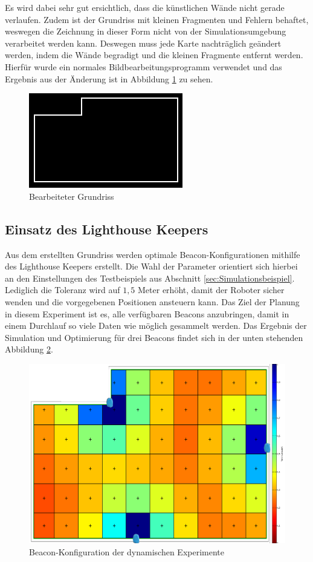 Es wird dabei sehr gut ersichtlich, dass die künstlichen Wände nicht gerade verlaufen. Zudem ist der Grundriss mit kleinen Fragmenten und Fehlern behaftet, weswegen die Zeichnung in dieser Form nicht von der Simulationsumgebung verarbeitet werden kann. Deswegen muss jede Karte nachträglich geändert werden, indem die Wände begradigt und die kleinen Fragmente entfernt werden. Hierfür wurde ein normales Bildbearbeitungsprogramm verwendet und das Ergebnis aus der Änderung ist in Abbildung \ref{fig:Masterraum2} zu sehen.  
\begin{figure}[H] 
\centering
\includegraphics[scale=0.8]{Bilder/Masterraum2}
\caption{Bearbeiteter Grundriss}
\label{fig:Masterraum2}
\end{figure}
\subsection{Einsatz des Lighthouse Keepers}
Aus dem erstellten Grundriss werden optimale Beacon-Konfigurationen mithilfe des Lighthouse Keepers erstellt. Die Wahl der Parameter orientiert sich hierbei an den Einstellungen des Testbeispiels aus Abschnitt \ref{sec:Simulationsbeispiel}. Lediglich die Toleranz wird auf $1,5$ Meter erhöht, damit der Roboter sicher wenden und die vorgegebenen Positionen ansteuern kann. Das Ziel der Planung in diesem Experiment ist es, alle verfügbaren Beacons anzubringen, damit in einem Durchlauf so viele Daten wie möglich gesammelt werden. Das Ergebnis der Simulation und Optimierung für drei Beacons findet sich in der unten stehenden Abbildung \ref{fig:BeacKon}.
\begin{figure}[H] 
\centering
\includegraphics[scale=0.22]{Bilder/SimMasterraum}
\caption{Beacon-Konfiguration der dynamischen Experimente}
\label{fig:BeacKon}
\end{figure}
